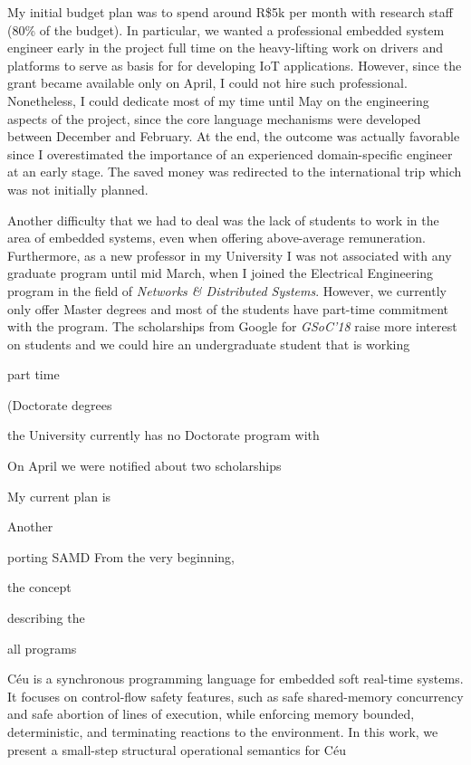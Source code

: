 \documentclass[12pt,english]{amsart}
\begin{document}
My initial budget plan was to spend around R\$5k per month with research staff
(80\% of the budget).
In particular, we wanted a professional embedded system engineer early in the
project full time on the heavy-lifting work on drivers and platforms to serve
as basis for for developing IoT applications.
%
However, since the grant became available only on April, I could not hire such
professional.
%
Nonetheless, I could dedicate most of my time until May on the engineering
aspects of the project, since the core language mechanisms were developed
between December and February.
At the end, the outcome was actually favorable since I overestimated the
importance of an experienced domain-specific engineer at an early stage.
The saved money was redirected to the international trip which was not
initially planned.

Another difficulty that we had to deal was the lack of students to work in the
area of embedded systems, even when offering above-average remuneration.
%
Furthermore, as a new professor in my University I was not associated with any
graduate program until mid March, when I joined the Electrical Engineering
program in the field of \emph{Networks \& Distributed Systems}.
However, we currently only offer Master degrees and most of the students have
part-time commitment with the program.
%
The scholarships from Google for \emph{GSoC'18} raise more interest on students
and we could hire an undergraduate student that is working 


part time

(Doctorate degrees

the University currently has no Doctorate program with 


On April we were notified about two scholarships 




%
My current plan is 

Another



porting 
SAMD
From the very beginning, 




the concept


describing the 

all programs 

Céu is a synchronous programming language for embedded soft real-time systems. It focuses on control-flow safety features, such as safe shared-memory concurrency and safe abortion of lines of execution, while enforcing memory bounded, deterministic, and terminating reactions to the environment.
In this work, we present a small-step structural operational semantics for Céu
\end{document}
